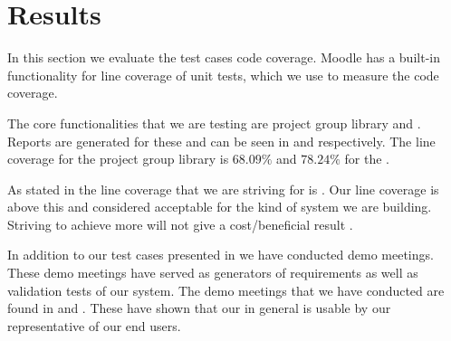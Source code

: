 \section{Results}
\label{sec:results}
In this section we evaluate the test cases code coverage. 
Moodle has a built-in functionality for line coverage of unit tests, which we use to measure the code coverage.

The core functionalities that we are testing are project group library and \admlib{}.
Reports are generated for these and can be seen in  and  respectively.
The line coverage for the project group library is $68.09\%$ and $78.24\%$ for the \admlib{}.

As stated in  the line coverage that we are striving for is \idealCC{}.
Our line coverage is above this and considered acceptable for the kind of system we are building. 
Striving to achieve more will not give a cost/beneficial result .

In addition to our test cases presented in  we have conducted demo meetings.
These demo meetings have served as generators of requirements as well as validation tests of our system.
The demo meetings that we have conducted are found in  and .
These have shown that our \subsystem{} in general is usable by our representative of our end users.